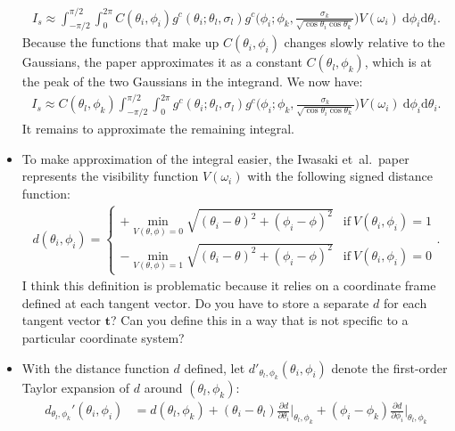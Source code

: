 \documentclass[10pt]{article}
\newcommand{\dee}{\mathrm{d}}
\newcommand{\ve}[1]{\mathbf{#1}}
\newcommand{\etal}{{et~al.}}
\begin{document}
\begin{itemize}
    \begin{align*}
      I_s \approx \int_{-\pi/2}^{\pi/2} \int_{0}^{2\pi} C(\theta_i, \phi_i) g^c(\theta_i;\theta_l,\sigma_l) g^c\bigg(\phi_i; \phi_k, \frac{\sigma_k}{\sqrt{\cos\theta_i\cos\theta_k}}\bigg) V(\omega_i)\ \dee\phi_i \dee\theta_i.
    \end{align*}
    Because the functions that make up $C(\theta_i, \phi_i)$ changes slowly relative to the Gaussians, the paper approximates it as a constant $C(\theta_l, \phi_k)$, which is at the peak of the two Gaussians in the integrand.  We now have:
    \begin{align*}
      I_s \approx C(\theta_l, \phi_k) \int_{-\pi/2}^{\pi/2} \int_{0}^{2\pi} g^c(\theta_i;\theta_l,\sigma_l) g^c\bigg(\phi_i; \phi_k, \frac{\sigma_k}{\sqrt{\cos\theta_i\cos\theta_k}}\bigg) V(\omega_i)\ \dee\phi_i \dee\theta_i.
    \end{align*}
    It remains to approximate the remaining integral.

    \item To make approximation of the integral easier, the Iwasaki \etal\ paper represents the visibility function $V(\omega_i)$ with the following signed distance function:
    \begin{align*}
      d(\theta_i,\phi_i) = \begin{cases}
        + \min_{V(\theta,\phi) = 0} \sqrt{(\theta_i - \theta)^2 + (\phi_i - \phi)^2}
        & \mathrm{if}\ V(\theta_i,\phi_i) = 1 \\
        - \min_{V(\theta,\phi) = 1} \sqrt{(\theta_i - \theta)^2 + (\phi_i - \phi)^2}
        & \mathrm{if}\ V(\theta_i,\phi_i) = 0
      \end{cases}.
    \end{align*}
    I think this definition is problematic because it relies on a coordinate frame defined at each tangent vector.  Do you have to store a separate $d$ for each tangent vector $\ve{t}$?  Can you define this in a way that is not specific to a particular coordinate system?

    \item With the distance function $d$ defined, let $d'_{\theta_l, \phi_k}(\theta_i,\phi_i)$ denote the first-order Taylor expansion of $d$ around $(\theta_l, \phi_k)$:
    \begin{align*}
      d_{\theta_l, \phi_k}'(\theta_i, \phi_i)
      &= d(\theta_l, \phi_k) 
      + (\theta_i - \theta_l)\frac{\partial d}{\partial \theta_i}\bigg|_{\theta_l,\phi_k}
      + (\phi_i - \phi_k)\frac{\partial d}{\partial \phi_i}\bigg|_{\theta_l,\phi_k}
    \end{align*}


\end{itemize}
\end{document}
